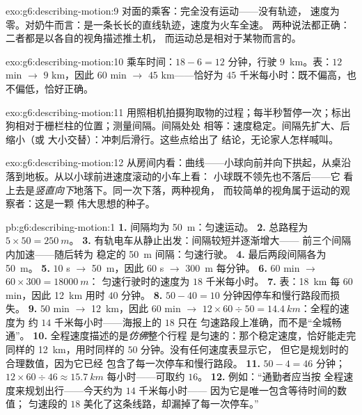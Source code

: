 \begin{solution}{exo:g6:describing-motion:9}
对面的乘客：完全没有运动——没有轨迹，
速度为零。对奶牛而言：是一条长长的直线轨迹，速度为火车全速。
两种说法都正确：二者都是以各自的视角描述推土机，
而运动总是相对于某物而言的。
\end{solution}

\begin{solution}{exo:g6:describing-motion:10}
乘车时间：$18 - 6 = 12$ 分钟，行驶 \qty{9}{km}。表：$12$
min $\to$ $9$ km，因此 $60$ min $\to$ $45$ km——恰好为 $45$
千米每小时：既不偏高，也不偏低，恰好正确。
\end{solution}

\begin{solution}{exo:g6:describing-motion:11}
用照相机拍摄狗取物的过程；每半秒暂停一次；标出
狗相对于栅栏柱的位置；测量间隔。间隔处处
相等：速度稳定。间隔先扩大、后缩小（或
大小交替）：冲刺后滑行。这些点给出了
结论，无论家人怎样喊叫。
\end{solution}

\begin{solution}{exo:g6:describing-motion:12}
从房间内看：曲线——小球向前并向下拱起，从桌沿
落到地板。从以小球前进速度滚动的小车上看：
小球既不领先也不落后——它
看上去是\emph{竖直向下}地落下。同一次下落，两种视角，
而较简单的视角属于运动的观察者：这是一颗
伟大思想的种子。
\end{solution}

\begin{solution}{pb:g6:describing-motion:1}
\textbf{1.} 间隔均为 \qty{50}{m}：匀速运动。
\textbf{2.} 总路程为 $5 \times 50 = \qty{250}{m}$。
\textbf{3.} 有轨电车从静止出发：间隔较短并逐渐增大——
前三个间隔内加速——随后转为
稳定的 \qty{50}{m} 间隔：匀速行驶。
\textbf{4.} 最后两段间隔各为 \qty{50}{m}。
\textbf{5.} $10$ s $\to$ \qty{50}{m}，因此 $60$ s $\to$
\qty{300}{m} 每分钟。
\textbf{6.} $60$ min $\to$ $60 \times 300 = \qty{18000}{m}$：
匀速行驶时的速度为 $18$ 千米每小时。
\textbf{7.} 表：\qty{18}{km} 每 $60$ min，因此 \qty{12}{km} 用时
$40$ 分钟。
\textbf{8.} $50 - 40 = 10$ 分钟因停车和慢行路段而损失。
\textbf{9.} $50$ min $\to$ \qty{12}{km}，因此 $60$ min $\to$
$12 \times 60 \div 50 = \qty{14.4}{km}$：全程的速度为
约 $14$ 千米每小时——海报上的 $18$ 只在
匀速路段上准确，而不是“全城畅通”。
\textbf{10.} 全程速度描述的是\emph{仿佛}整个行程
是匀速的：那个稳定速度，恰好能走完
同样的 \qty{12}{km}，用时同样的 $50$ 分钟。没有任何速度表显示它，
但它是规划时的合理数值，因为它已经
包含了每一次停车和慢行路段。
\textbf{11.} $50 - 4 = 46$ 分钟；$12 \times 60 \div 46 \approx
\qty{15.7}{km}$ 每小时——可取约 $16$。
\textbf{12.} 例如：“通勤者应当按
全程速度来规划出行——今天约为 $14$ 千米每小时——
因为它是唯一包含等待时间的数值；
匀速段的 $18$ 美化了这条线路，却漏掉了每一次停车。”
\end{solution}
